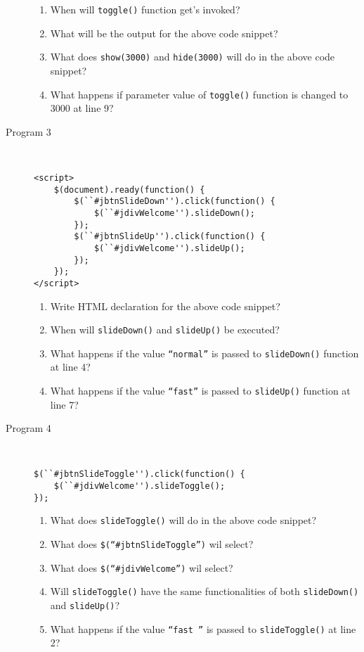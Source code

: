 \documentclass[11pt,a4paper]{article}
\def\AnswerBox{\fbox{\begin{minipage}{4in}\hfill\vspace{0.5in}\end{minipage}}}
\begin{document}
\begin{description}
\AnswerBox

\begin{enumerate}[label=\bfseries Q\arabic*:]\itemsep10pt
\item When will \texttt{toggle()} function get's invoked?
\item What will be the output for the above code snippet?
\item What does \texttt{show(3000)} and \texttt{hide(3000)} will do in the above code snippet?
\item What happens if parameter value of \texttt{toggle()} function is changed to 3000 at line 9?
\end{enumerate}
\item [Program 3]\ 
\begin{lstlisting}
<script>
    $(document).ready(function() {
        $(``#jbtnSlideDown'').click(function() {
            $(``#jdivWelcome'').slideDown();
        });
        $(``#jbtnSlideUp'').click(function() {
            $(``#jdivWelcome'').slideUp();
        });
    });
</script>
\end{lstlisting}
\AnswerBox

\begin{enumerate}[label=\bfseries Q\arabic*:]\itemsep10pt
\item Write HTML declaration for the above code snippet?
\item When will \texttt{slideDown()} and \texttt{slideUp()} be executed?
\item What happens if the value \texttt{``normal''} is passed to \texttt{slideDown()} function at line 4?
\item What happens if the value \texttt{``fast''} is passed to \texttt{slideUp()} function at line 7?
\end{enumerate}

\item [Program 4]\ 
\begin{lstlisting}
$(``#jbtnSlideToggle'').click(function() {
    $(``#jdivWelcome'').slideToggle();
});
\end{lstlisting}
\AnswerBox

\begin{enumerate}[label=\bfseries Q\arabic*:]\itemsep10pt
\item What does \texttt{slideToggle()} will do in the above code snippet?
\item What does \texttt{\$(``\#jbtnSlideToggle'')} wil select?
\item What does \texttt{\$(``\#jdivWelcome'')} wil select?
\item Will \texttt{slideToggle()} have the same functionalities of both \texttt{slideDown()} and \texttt{slideUp()}?
\item What happens if the value \texttt{``fast ''} is passed to \texttt{slideToggle()} at line 2?
\end{enumerate}


\end{description}
\end{document}
